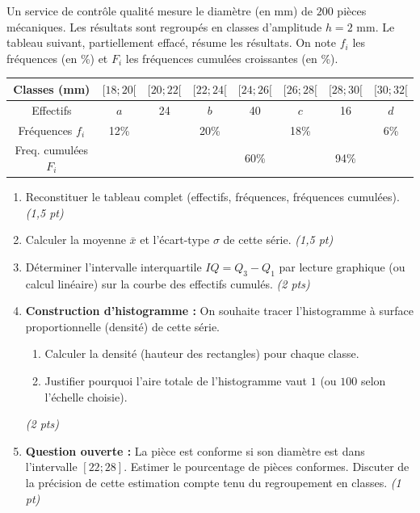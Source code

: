 \documentclass[11pt]{article}
\begin{document}
\begin{exercice}
Un service de contrôle qualité mesure le diamètre (en mm) de $200$ pièces mécaniques. Les résultats sont regroupés en classes d'amplitude $h = 2$ mm. Le tableau suivant, partiellement effacé, résume les résultats. On note $f_i$ les fréquences (en \%) et $F_i$ les fréquences cumulées croissantes (en \%).

\begin{center}
\begin{tabular}{|c|c|c|c|c|c|c|c|}
\hline
Classes (mm) & $[18; 20[$ & $[20; 22[$ & $[22; 24[$ & $[24; 26[$ & $[26; 28[$ & $[28; 30[$ & $[30; 32[$ \\ \hline
Effectifs & $a$ & 24 & $b$ & 40 & $c$ & 16 & $d$ \\ \hline
Fréquences $f_i$ & 12\% & & 20\% & & 18\% & & 6\% \\ \hline
Freq. cumulées $F_i$ & & & & 60\% & & 94\% & \\ \hline
\end{tabular}
\end{center}

\begin{enumerate}
    \item Reconstituer le tableau complet (effectifs, fréquences, fréquences cumulées). \textit{(1,5 pt)}
    \item Calculer la moyenne $\bar{x}$ et l'écart-type $\sigma$ de cette série. \textit{(1,5 pt)}
    \item Déterminer l'intervalle interquartile $IQ = Q_3 - Q_1$ par lecture graphique (ou calcul linéaire) sur la courbe des effectifs cumulés. \textit{(2 pts)}
    \item \textbf{Construction d'histogramme :} On souhaite tracer l'histogramme à surface proportionnelle (densité) de cette série.
    \begin{enumerate}
        \item Calculer la densité (hauteur des rectangles) pour chaque classe.
        \item Justifier pourquoi l'aire totale de l'histogramme vaut $1$ (ou $100$ selon l'échelle choisie).
    \end{enumerate}
    \textit{(2 pts)}
    \item \textbf{Question ouverte :} La pièce est conforme si son diamètre est dans l'intervalle $[22; 28]$. Estimer le pourcentage de pièces conformes. Discuter de la précision de cette estimation compte tenu du regroupement en classes. \textit{(1 pt)}
\end{enumerate}
\end{exercice}
\end{document}
